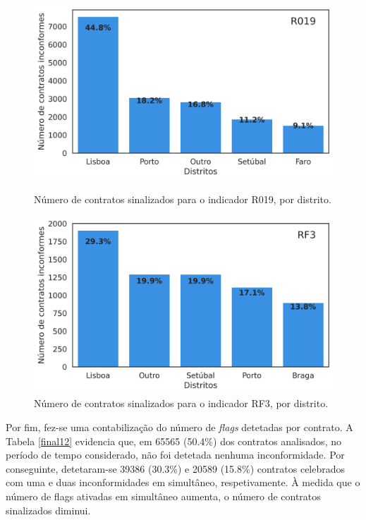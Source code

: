 \begin{figure}[H]
	\centering
	\begin{minipage}{.44\linewidth}
		\includegraphics[width=\linewidth]{imagens/final/bar_R019.png}
		\caption{Número de contratos sinalizados para o indicador R019, por distrito.}
		\label{final10}
		
	\end{minipage}
	\hfill
	\begin{minipage}{.44\linewidth}
		\includegraphics[width=\linewidth]{imagens/final/bar_RF3.png}
		\caption{Número de contratos sinalizados para o indicador RF3, por distrito.}
		\label{final11}
		
	\end{minipage}
\end{figure}


Por fim, fez-se uma contabilização do número de \textit{flags} detetadas por contrato. A Tabela \ref{final12} evidencia que, em 65565 (50.4\%) dos contratos analisados, no período de tempo considerado, não foi detetada nenhuma inconformidade. Por conseguinte, detetaram-se 39386 (30.3\%) e 20589 (15.8\%) contratos celebrados com uma e duas inconformidades em simultâneo, respetivamente. À medida que o número de flags ativadas em simultâneo aumenta, o número de contratos sinalizados diminui. 

